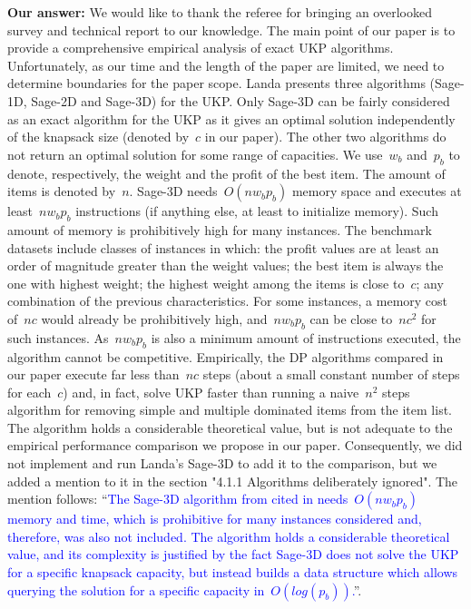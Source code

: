 \documentclass{elsarticle}
\begin{document}
\textbf{Our answer:}
We would like to thank the referee for bringing an overlooked survey and technical report to our knowledge.
The main point of our paper is to provide a comprehensive empirical analysis of exact UKP algorithms.
Unfortunately, as our time and the length of the paper are limited, we need to determine boundaries for the paper scope.
Landa presents three algorithms (Sage-1D, Sage-2D and Sage-3D) for the UKP.
Only Sage-3D can be fairly considered as an exact algorithm for the UKP as it gives an optimal solution independently of the knapsack size (denoted by~\(c\) in our paper).
The other two algorithms do not return an optimal solution for some range of capacities.
We use~\(w_b\) and~\(p_b\) to denote, respectively, the weight and the profit of the best item.
The amount of items is denoted by~\(n\).
Sage-3D needs~\(O(n w_b p_b)\) memory space and executes at least~\(n w_b p_b\) instructions (if anything else, at least to initialize memory).
Such amount of memory is prohibitively high for many instances.
The benchmark datasets include classes of instances in which: the profit values are at least an order of magnitude greater than the weight values; the best item is always the one with highest weight; the highest weight among the items is close to~\(c\); any combination of the previous characteristics.
For some instances, a memory cost of~\(nc\) would already be prohibitively high, and~\(n w_b p_b\) can be close to~\(n c^2\) for such instances.
As~\(n w_b p_b\) is also a minimum amount of instructions executed, the algorithm cannot be competitive.
Empirically, the DP algorithms compared in our paper execute far less than~\(nc\) steps (about a small constant number of steps for each~\(c\)) and, in fact, solve UKP faster than running a naive~\(n^2\) steps algorithm for removing simple and multiple dominated items from the item list.
The algorithm holds a considerable theoretical value, but is not adequate to the empirical performance comparison we propose in our paper.
Consequently, we did not implement and run Landa's Sage-3D to add it to the comparison, but we added a mention to it in the section "4.1.1 Algorithms deliberately ignored".
The mention follows: ``\textcolor{blue}{The Sage-3D algorithm from \cite{landa_sage} cited in \cite{ukp_hu_landa_shing_survey} needs~\(O(n w_b p_b)\) memory and time, which is prohibitive for many instances considered and, therefore, was also not included.
The algorithm holds a considerable theoretical value, and its complexity is justified by the fact Sage-3D does not solve the UKP for a specific knapsack capacity, but instead builds a data structure which allows querying the solution for a specific capacity in~\(O(log(p_b))\).}''.
\medskip
\end{document}
